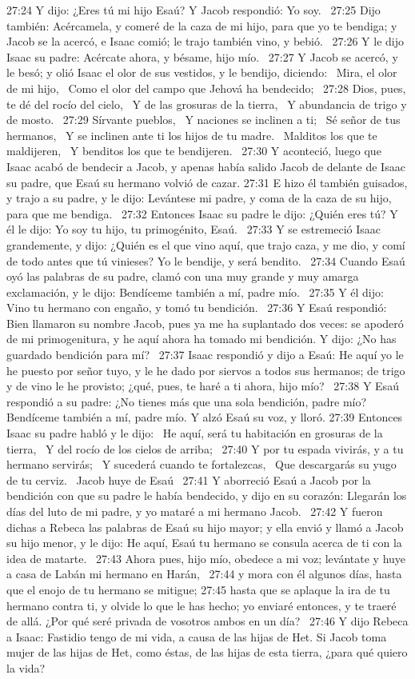 27:24 Y dijo: ¿Eres tú mi hijo Esaú? Y Jacob respondió: Yo soy.  
27:25 Dijo también: Acércamela, y comeré de la caza de mi hijo, para que yo te bendiga; y Jacob se la acercó, e Isaac comió; le trajo también vino, y bebió.  
27:26 Y le dijo Isaac su padre: Acércate ahora, y bésame, hijo mío.  
27:27 Y Jacob se acercó, y le besó; y olió Isaac el olor de sus vestidos, y le bendijo, diciendo:  
Mira, el olor de mi hijo,  
Como el olor del campo que Jehová ha bendecido;  
27:28 Dios, pues, te dé del rocío del cielo,  
Y de las grosuras de la tierra,  
Y abundancia de trigo y de mosto.  
27:29 Sírvante pueblos,  
Y naciones se inclinen a ti;  
Sé señor de tus hermanos,  
Y se inclinen ante ti los hijos de tu madre.  
Malditos los que te maldijeren,  
Y benditos los que te bendijeren.  
27:30 Y aconteció, luego que Isaac acabó de bendecir a Jacob, y apenas había salido Jacob de delante de Isaac su padre, que Esaú su hermano volvió de cazar. 
27:31 E hizo él también guisados, y trajo a su padre, y le dijo: Levántese mi padre, y coma de la caza de su hijo, para que me bendiga.  
27:32 Entonces Isaac su padre le dijo: ¿Quién eres tú? Y él le dijo: Yo soy tu hijo, tu primogénito, Esaú.  
27:33 Y se estremeció Isaac grandemente, y dijo: ¿Quién es el que vino aquí, que trajo caza, y me dio, y comí de todo antes que tú vinieses? Yo le bendije, y será bendito.  
27:34 Cuando Esaú oyó las palabras de su padre, clamó con una muy grande y muy amarga exclamación, y le dijo: Bendíceme también a mí, padre mío.  
27:35 Y él dijo: Vino tu hermano con engaño, y tomó tu bendición.  
27:36 Y Esaú respondió: Bien llamaron su nombre Jacob, pues ya me ha suplantado dos veces: se apoderó de mi primogenitura, y he aquí ahora ha tomado mi bendición. Y dijo: ¿No has guardado bendición para mí?  
27:37 Isaac respondió y dijo a Esaú: He aquí yo le he puesto por señor tuyo, y le he dado por siervos a todos sus hermanos; de trigo y de vino le he provisto; ¿qué, pues, te haré a ti ahora, hijo mío?  
27:38 Y Esaú respondió a su padre: ¿No tienes más que una sola bendición, padre mío? Bendíceme también a mí, padre mío. Y alzó Esaú su voz, y lloró. 
27:39 Entonces Isaac su padre habló y le dijo:  
He aquí, será tu habitación en grosuras de la tierra,  
Y del rocío de los cielos de arriba;  
27:40 Y por tu espada vivirás, y a tu hermano servirás;  
Y sucederá cuando te fortalezcas,  
Que descargarás su yugo de tu cerviz.  
Jacob huye de Esaú  
27:41 Y aborreció Esaú a Jacob por la bendición con que su padre le había bendecido, y dijo en su corazón: Llegarán los días del luto de mi padre, y yo mataré a mi hermano Jacob.  
27:42 Y fueron dichas a Rebeca las palabras de Esaú su hijo mayor; y ella envió y llamó a Jacob su hijo menor, y le dijo: He aquí, Esaú tu hermano se consula acerca de ti con la idea de matarte.  
27:43 Ahora pues, hijo mío, obedece a mi voz; levántate y huye a casa de Labán mi hermano en Harán,  
27:44 y mora con él algunos días, hasta que el enojo de tu hermano se mitigue; 
27:45 hasta que se aplaque la ira de tu hermano contra ti, y olvide lo que le has hecho; yo enviaré entonces, y te traeré de allá. ¿Por qué seré privada de vosotros ambos en un día?  
27:46 Y dijo Rebeca a Isaac: Fastidio tengo de mi vida, a causa de las hijas de Het. Si Jacob toma mujer de las hijas de Het, como éstas, de las hijas de esta tierra, ¿para qué quiero la vida?  
